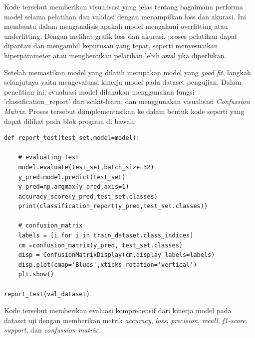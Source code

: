 Kode tersebut memberikan visualisasi yang jelas tentang bagaimana performa model selama pelatihan dan validasi dengan menampilkan loss dan akurasi. Ini membantu dalam menganalisis apakah model mengalami overfitting atau underfitting. Dengan melihat grafik loss dan akurasi, proses pelatihan dapat dipantau dan mengambil keputusan yang tepat, seperti menyesuaikan hiperparameter atau menghentikan pelatihan lebih awal jika diperlukan.

Setelah memastikan model yang dilatih merupakan model yang \textit{good fit}, langkah selanjutnya yaitu mengevaluasi kinerja model pada dataset pengujian. Dalam penelitian ini, evualuasi model dilakukan menggunakan fungsi 'classification\_report' dari scikit-learn, dan menggunakan visualisasi \textit{Confussion Matrix}. Proses tersebut diimplementasikan ke dalam bentuk kode seperti yang dapat dilihat pada blok program di bawah:
\begin{lstlisting}[style=customc]
def report_test(test_set,model=model):

    # evaluating test
    model.evaluate(test_set,batch_size=32)
    y_pred=model.predict(test_set)
    y_pred=np.argmax(y_pred,axis=1)
    accuracy_score(y_pred,test_set.classes)
    print(classification_report(y_pred,test_set.classes))

    # confusion_matrix
    labels = [i for i in train_dataset.class_indices]
    cm =confusion_matrix(y_pred, test_set.classes)
    disp = ConfusionMatrixDisplay(cm,display_labels=labels)
    disp.plot(cmap='Blues',xticks_rotation='vertical')
    plt.show()

report_test(val_dataset)
\end{lstlisting}

Kode tersebut memberikan evaluasi komprehensif dari kinerja model pada dataset uji dengan memberikan metrik \textit{accuracy}, \textit{loss}, \textit{precision}, \textit{recall}, \textit{f1-score}, \textit{support}, dan \textit{confussion matrix}.

